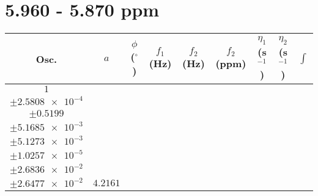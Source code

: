 \documentclass[8pt]{article}
\begin{document}
\section*{5.960 - 5.870 ppm}
\begin{longtable}[l]{c c c c c c c c c}
\toprule
Osc. & $a$ & $\phi$ ($^{\circ}$) & $f_1$ (Hz) & $f_2$ (Hz) & $f_2$ (ppm) & $\eta_1$ (s$^{-1}$) & $\eta_2$ (s$^{-1}$) & $\int$\\
\midrule
$\num{1}$ & \begin{tabular}[c]{@{}c@{}}$\num{3.1129e-2}$ \\ $\pm\num{2.5808e-4}$\end{tabular} & \begin{tabular}[c]{@{}c@{}}$\num{-1.3434}$ \\ $\pm\num{0.5199}$\end{tabular} & \begin{tabular}[c]{@{}c@{}}$\num{-7.4002}$ \\ $\pm\num{5.1685e-3}$\end{tabular} & \begin{tabular}[c]{@{}c@{}}$\num{2.9494e+3}$ \\ $\pm\num{5.1273e-3}$\end{tabular} & \begin{tabular}[c]{@{}c@{}}$\num{5.9004}$ \\ $\pm\num{1.0257e-5}$\end{tabular} & \begin{tabular}[c]{@{}c@{}}$\num{3.5669}$ \\ $\pm\num{2.6836e-2}$\end{tabular} & \begin{tabular}[c]{@{}c@{}}$\num{3.5178}$ \\ $\pm\num{2.6477e-2}$\end{tabular} & $\num{4.2161}$\\

\end{longtable}
\end{document}
